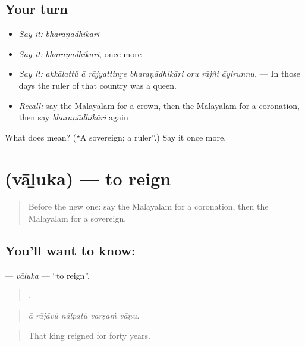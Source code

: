\subsection*{Your turn}
\begin{itemize}
\raggedright
  \item \emph{Say it:} \emph{bharaṇādhikāri}
  \item \emph{Say it:} \emph{bharaṇādhikāri}, once more
  \item \emph{Say it:} \emph{akkālattŭ ā rājyattinṟe bharaṇādhikāri oru rājñi āyirunnu.} — In those days the ruler of that country was a queen.
  \item \emph{Recall:} say the Malayalam for a crown, then the Malayalam for a coronation, then say \emph{bharaṇādhikāri} again
\end{itemize}

\begin{tcolorbox}[breakable,colback=teal!4,colframe=teal!35!black,title={Before you move on}]
What does  mean? (\textquotedblleft{}A sovereign; a ruler\textquotedblright{}.) Say it once more.
\end{tcolorbox}
\section[\texorpdfstring{\ml{വാഴുക} (vāḻuka)}{വാഴുക (vāḻuka)}]{ (vāḻuka) — to reign}

\label{lesson:ML-C398-valuka}



\begin{quote}
Before the new one: say the Malayalam for a coronation, then the Malayalam for a sovereign.
\end{quote}

\subsection*{You'll want to know: }
\textbf{} — \emph{vāḻuka} — \textquotedblleft{}to reign\textquotedblright{}.

\begin{quote}
    .
\end{quote}

\begin{quote}
\emph{ā rājāvŭ nālpatŭ varṣaṁ vāṇu.}
\end{quote}

\begin{quote}
That king reigned for forty years.
\end{quote}

